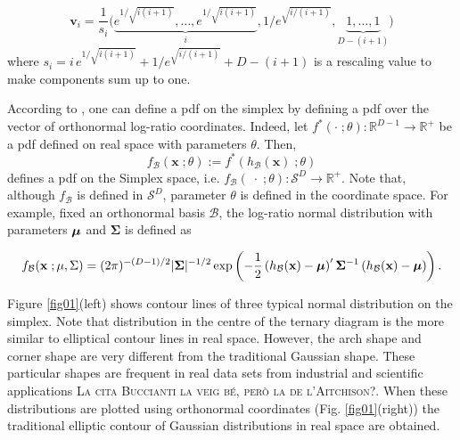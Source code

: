 \documentclass[10pt, a4paper]{article}
\begin{document}
\[
\textbf{v}_i = \frac{1}{s_i}\Big( \underbrace{e^{1/\sqrt{i(i+1)}}, \dots, e^{1/\sqrt{i(i+1)}}}_{i}, 1/e^{\sqrt{ i/(i+1)}}, \underbrace{1, \dots, 1}_{D-(i+1)} \Big) 
\]
where $s_i =  i\,e^{1/\sqrt{i(i+1)}} + 1/e^{\sqrt{ i/(i+1)}} + D - (i+1)$ is a rescaling value to make components sum up to one.


According to \cite{mateu2013normal}, one can define a pdf on the simplex by defining a pdf over the vector of orthonormal log-ratio coordinates. Indeed, let $f^*(\cdot \;; \theta) : \mathbb{R}^{D-1} \rightarrow \mathbb{R}^+$ be a pdf defined on real space with parameters $\theta$. Then, \[f_\mathcal{B}(\mathbf{x}\;; \theta) := f^*(h_\mathcal{B}(\textbf{x})\;; \theta)\] defines a pdf on the Simplex space, i.e. $f_\mathcal{B}(\;\cdot\;; \theta): \mathcal{S}^D \rightarrow \mathbb{R}^+$. Note that, although $f_\mathcal{B}$ is defined in $\mathcal{S}^D$, parameter $\theta$ is defined in the coordinate space. For example, fixed an orthonormal basis $\mathcal{B}$, the log-ratio normal distribution with parameters $\mbox{\boldmath \(\mu\)}$ and $\mathbf{\Sigma}$ is defined as

\begin{equation}\label{eq:densSNormal}
f_\mathcal{B}(\mathbf{x}\;; \mu, \Sigma) =(2\pi)^{-(D-1)/2} |\mathbf{\Sigma}|^{-1/2} \exp \left( -{\frac{1}{2}} \left(h_\mathcal{B}(\textbf{x})- \mbox{\boldmath \(\mu\)} \right)' \mathbf{\Sigma}^{-1} \left( h_\mathcal{B}(\textbf{x})- \mbox{\boldmath\(\mu\)} \right)\right).
\end{equation}


Figure \ref{fig01}(left) shows  contour lines of three typical normal distribution on the simplex. Note that distribution in the centre of the ternary diagram is the more similar to elliptical contour lines in real space. However, the arch shape and corner shape are very different from the traditional Gaussian shape. These particular shapes are frequent in real data sets from industrial and scientific applications \citep{aitchison1986statistical, buccianti2011natural} \textsc{\color{red}La cita Buccianti la veig bé, però la de l'Aitchison?}.
When these distributions are plotted using orthonormal coordinates (Fig. \ref{fig01}(right)) the traditional elliptic contour of
Gaussian distributions in real space are obtained.
\end{document}
